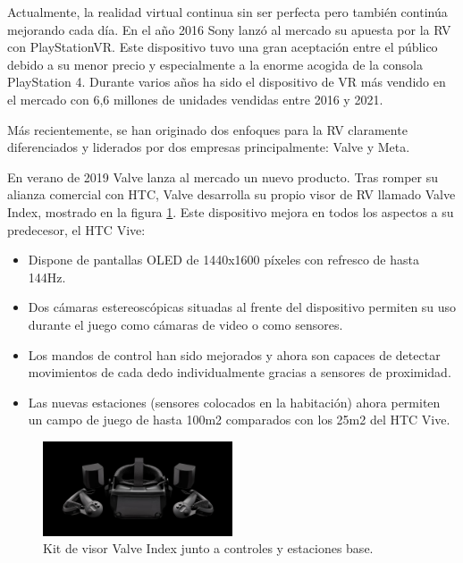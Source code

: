 Actualmente, la realidad virtual continua sin ser perfecta pero también continúa mejorando cada día. En el año 2016 Sony lanzó al mercado su apuesta por la RV con PlayStationVR. Este dispositivo tuvo una gran aceptación entre el público debido a su menor precio y especialmente a la enorme acogida de la consola PlayStation 4. Durante varios años ha sido el dispositivo de VR más vendido en el mercado con 6,6 millones de unidades vendidas entre 2016 y 2021. \cite{EA_vr_ventas} 


Más recientemente, se han originado dos enfoques para la RV claramente diferenciados y liderados por dos empresas principalmente: Valve y Meta.

En verano de 2019 Valve lanza al mercado un nuevo producto. Tras romper su alianza comercial con HTC, Valve desarrolla su propio visor de RV llamado Valve Index, mostrado en la figura \ref{fig:EA_index}. Este dispositivo mejora en todos los aspectos a su predecesor, el HTC Vive: \cite{EA_vr_index}


\begin{itemize}
	\item{Dispone de pantallas OLED de 1440x1600 píxeles con refresco de hasta 144Hz.}

	\item{Dos cámaras estereoscópicas situadas al frente del dispositivo permiten su uso durante el juego como cámaras de video o como sensores.}

	\item{Los mandos de control han sido mejorados y ahora son capaces de detectar movimientos de cada dedo individualmente gracias a sensores de proximidad.}
	
	\item{Las nuevas estaciones (sensores colocados en la habitación) ahora permiten un campo de juego de hasta 100m2 comparados con los 25m2 del HTC Vive.}

\end{itemize}


\begin{figure}
  \centering
\includegraphics[width=0.5\textwidth]{03.EstudioProblema/01.EstadoArte/00.Figuras/24.valve_index.jpg}
    \caption{Kit de visor Valve Index junto a controles y estaciones base. \cite{EA_img_index}}
    \label{fig:EA_index}
\end{figure}



